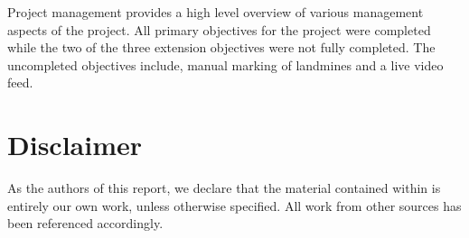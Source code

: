 \documentclass[main.tex]{subfiles}
\begin{document}
Project management provides a high level overview of various management aspects of the project. All primary objectives for the project were completed while the two of the three extension objectives were not fully completed. The uncompleted objectives include, manual marking of landmines and a live video feed.



 






\newpage
{}
{}	%
\chapter*{Disclaimer}
As the authors of this report, we declare that the material contained within is entirely our own work, unless otherwise specified. All work from other sources has been referenced accordingly. 
\vspace{0.4in}
\end{document}
